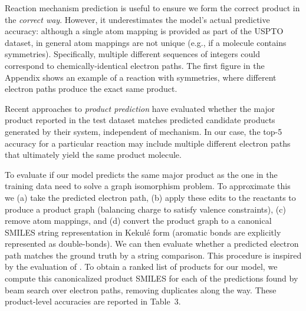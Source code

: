 Reaction mechanism prediction is useful to ensure we form the correct product in the {\em correct way}.
However, it underestimates the model's actual predictive accuracy: although a single atom mapping is provided as part of the USPTO dataset, in general atom mappings are not unique (e.g., if a molecule contains symmetries). Specifically, multiple different sequences of integers could correspond to chemically-identical electron paths. 
The first figure in the Appendix shows an example of a reaction with symmetries, where different electron paths produce the exact same product. 

Recent approaches to {\em product prediction} \citep{jin2017predicting,schwaller2017found}
have evaluated whether the major product reported in the test dataset matches predicted candidate products generated by their system, independent of mechanism.
In our case, the top-5 accuracy for a particular reaction may include multiple different electron paths that ultimately yield the same product molecule.

To evaluate if our model predicts the same major product as the one in the training data need to solve a graph isomorphism problem. To approximate this 
we (a) take the predicted electron path, 
(b) apply these edits to the reactants to produce a product graph (balancing charge to satisfy valence constraints), 
(c) remove atom mappings,
and (d) convert the product graph to a canonical SMILES string representation in Kekul\'e form (aromatic bonds are explicitly represented as double-bonds). 
We can then evaluate whether a predicted electron path matches the ground truth by a string comparison. This procedure is inspired by the evaluation of \citet{schwaller2017found}. To obtain a ranked list of products for our model, we compute this canonicalized product SMILES for each of the predictions found by beam search over electron paths, removing duplicates along the way. 
These product-level accuracies are reported in Table~3.

